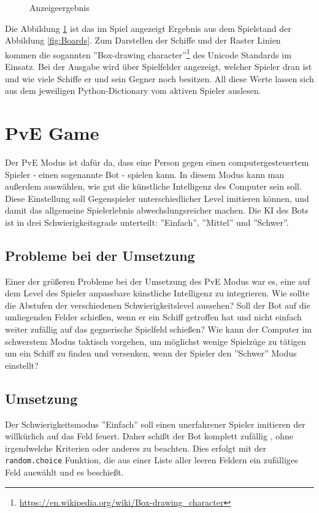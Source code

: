 \documentclass{article}
\begin{document}
\begin{figure}[H]
    \centering
    
    \caption{Anzeigeergebnis}
    \label{fig:Result}
\end{figure}

    Die Abbildung \ref{fig:Result} ist das im Spiel angezeigt Ergebnis aus dem Spielstand der Abbildung \ref{fig:Boards}. Zum Darstellen der Schiffe und der Raster Linien kommen die sogannten ''Box-drawing character''\footnote{\url{https://en.wikipedia.org/wiki/Box-drawing_character}} des Unicode Standards im Einsatz. Bei der Ausgabe wird über Spielfelder angezeigt, welcher Spieler dran ist und wie viele Schiffe er und sein Gegner noch besitzen. All diese Werte lassen sich aus dem jeweiligen Python-Dictionary vom aktiven Spieler auslesen.


\section{PvE Game}
       Der PvE Modus ist dafür da, dass eine Person gegen einen computergesteuertem Spieler - einen sogenannte Bot - spielen kann. In diesem Modus kann man außerdem auswählen, wie gut die künstliche Intelligenz des Computer sein soll. Diese Einstellung soll Gegenspieler unterschiedlicher Level imitieren können, und damit das allgemeine Spielerlebnis abwechslungsreicher machen. Die KI des Bots ist in drei Schwierigkeitsgrade unterteilt: ''Einfach'', ''Mittel'' und ''Schwer''.

\subsection{Probleme bei der Umsetzung}
    Einer der größeren Probleme bei der Umsetzung des PvE Modus war es, eine auf dem Level des Spieler anpassbare künstliche Intelligenz zu integrieren. Wie sollte die Abstufen der verschiedenen Schwierigkeitslevel aussehen? Soll der Bot auf die umliegenden Felder schießen, wenn er ein Schiff getroffen hat und nicht einfach weiter zufällig auf das gegnerische Spielfeld schießen? Wie kann der Computer im schwerstem Modus taktisch vorgehen, um möglichst wenige Spielzüge zu tätigen um ein Schiff zu finden und versenken, wenn der Spieler den ''Schwer'' Modus einstellt?

\subsection{Umsetzung}
    Der Schwierigkeitsmodus ''Einfach'' soll einen unerfahrener Spieler imitieren der willkürlich auf das Feld feuert. Daher schißt der Bot komplett zufällig , ohne irgendwelche Kriterien oder anderes zu beachten. Dies erfolgt mit der \verb$random.choice$ Funktion, die aus einer Liste aller leeren Feldern ein zufälliges Feld auswählt und es beschießt.\\
\end{document}
